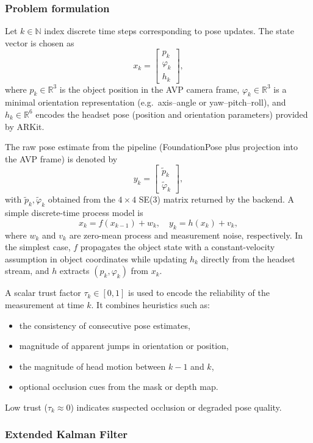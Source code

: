 \subsubsection*{Problem formulation}

Let $k \in \mathbb{N}$ index discrete time steps corresponding to pose updates. The state vector is chosen as
\[
x_k =
\begin{bmatrix}
p_k \\
\varphi_k \\
h_k
\end{bmatrix},
\]
where $p_k \in \mathbb{R}^3$ is the object position in the AVP camera frame, $\varphi_k \in \mathbb{R}^3$ is a minimal orientation representation (e.g.\ axis–angle or yaw–pitch–roll), and $h_k \in \mathbb{R}^6$ encodes the headset pose (position and orientation parameters) provided by ARKit.

The raw pose estimate from the pipeline (FoundationPose plus projection into the AVP frame) is denoted by
\[
y_k =
\begin{bmatrix}
\tilde{p}_k \\
\tilde{\varphi}_k
\end{bmatrix},
\]
with $\tilde{p}_k, \tilde{\varphi}_k$ obtained from the $4 \times 4$ SE(3) matrix returned by the backend. A simple discrete-time process model is
\[
x_k = f(x_{k-1}) + w_k,
\quad
y_k = h(x_k) + v_k,
\]
where $w_k$ and $v_k$ are zero-mean process and measurement noise, respectively. In the simplest case, $f$ propagates the object state with a constant-velocity assumption in object coordinates while updating $h_k$ directly from the headset stream, and $h$ extracts $(p_k,\varphi_k)$ from $x_k$.

A scalar trust factor $\tau_k \in [0,1]$ is used to encode the reliability of the measurement at time $k$. It combines heuristics such as:
\begin{itemize}
    \item the consistency of consecutive pose estimates,
    \item magnitude of apparent jumps in orientation or position,
    \item the magnitude of head motion between $k-1$ and $k$,
    \item optional occlusion cues from the mask or depth map.
\end{itemize}
Low trust ($\tau_k \approx 0$) indicates suspected occlusion or degraded pose quality.

\subsubsection*{Extended Kalman Filter}

